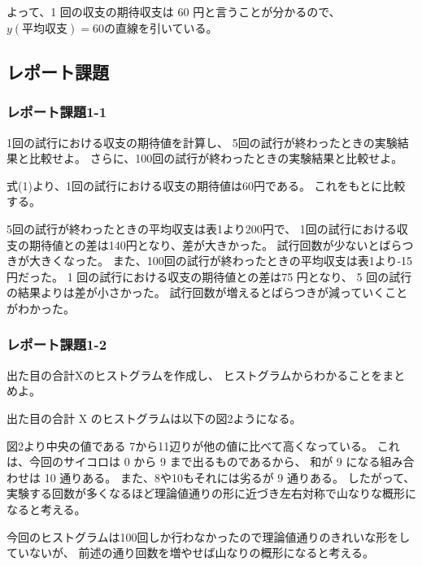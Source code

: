 \documentclass[12pt]{jarticle}
\begin{document}
よって、1 回の収支の期待収支は 60 円と言うことが分かるので、$y(平均収支)=60$の直線を引いている。

\subsection{レポート課題}
\subsubsection*{レポート課題1-1}
\begin{shadebox}
    1回の試行における収支の期待値を計算し、
    5回の試行が終わったときの実験結果と比較せよ。
    さらに、100回の試行が終わったときの実験結果と比較せよ。
\end{shadebox}
式(1)より、1回の試行における収支の期待値は60円である。
これをもとに比較する。

5回の試行が終わったときの平均収支は表1より200円で、
1回の試行における収支の期待値との差は140円となり、差が大きかった。
試行回数が少ないとばらつきが大きくなった。
また、100回の試行が終わったときの平均収支は表1より-15円だった。
1 回の試行における収支の期待値との差は75 円となり、
5 回の試行の結果よりは差が小さかった。
試行回数が増えるとばらつきが減っていくことがわかった。

\subsubsection*{レポート課題1-2}
\begin{shadebox}
    出た目の合計Xのヒストグラムを作成し、
    ヒストグラムからわかることをまとめよ。
\end{shadebox}
出た目の合計 X のヒストグラムは以下の図2ようになる。

図2より中央の値である 7から11辺りが他の値に比べて高くなっている。
これは、今回のサイコロは 0 から 9 まで出るものであるから、
和が 9 になる組み合わせは 10 通りある。
また、8や10もそれには劣るが 9 通りある。
したがって、実験する回数が多くなるほど理論値通りの形に近づき左右対称で山なりな概形になると考える。


今回のヒストグラムは100回しか行わなかったので理論値通りのきれいな形をしていないが、
前述の通り回数を増やせば山なりの概形になると考える。
\end{document}
